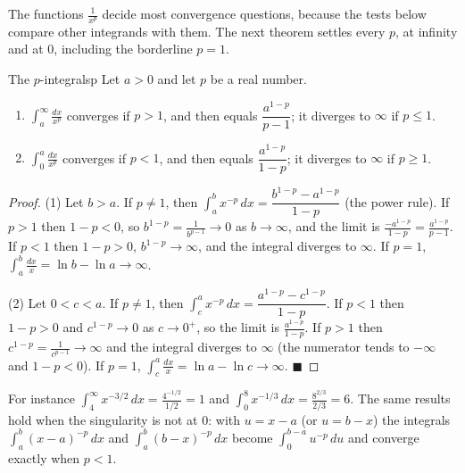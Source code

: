 \documentclass[11pt]{article}
\begin{document}
The functions $\frac1{x^p}$ decide most convergence questions, because the tests below compare other integrands with them. The next theorem settles every $p$, at infinity and at $0$, including the borderline $p=1$.

\begin{thm}{The $p$-integrals}{p}
Let $a>0$ and let $p$ be a real number.
\begin{enumerate}[label=(\arabic*),leftmargin=*]
  \item $\displaystyle\int_a^\infty\frac{dx}{x^p}$ converges if $p>1$, and then equals $\dfrac{a^{1-p}}{p-1}$; it diverges to $\infty$ if $p\le1$.
  \item $\displaystyle\int_0^a\frac{dx}{x^p}$ converges if $p<1$, and then equals $\dfrac{a^{1-p}}{1-p}$; it diverges to $\infty$ if $p\ge1$.
\end{enumerate}
\end{thm}
\begin{proof}
(1) Let $b>a$. If $p\ne1$, then $\int_a^bx^{-p}\,dx=\dfrac{b^{1-p}-a^{1-p}}{1-p}$ (the power rule). If $p>1$ then $1-p<0$, so $b^{1-p}=\frac1{b^{p-1}}\to0$ as $b\to\infty$, and the limit is $\frac{-a^{1-p}}{1-p}=\frac{a^{1-p}}{p-1}$. If $p<1$ then $1-p>0$, $b^{1-p}\to\infty$, and the integral diverges to $\infty$. If $p=1$, $\int_a^b\frac{dx}x=\ln b-\ln a\to\infty$.

(2) Let $0<c<a$. If $p\ne1$, then $\int_c^ax^{-p}\,dx=\dfrac{a^{1-p}-c^{1-p}}{1-p}$. If $p<1$ then $1-p>0$ and $c^{1-p}\to0$ as $c\to0^+$, so the limit is $\frac{a^{1-p}}{1-p}$. If $p>1$ then $c^{1-p}=\frac1{c^{p-1}}\to\infty$ and the integral diverges to $\infty$ (the numerator tends to $-\infty$ and $1-p<0$). If $p=1$, $\int_c^a\frac{dx}x=\ln a-\ln c\to\infty$. $\blacksquare$
\end{proof}

For instance $\int_4^\infty x^{-3/2}\,dx=\frac{4^{-1/2}}{1/2}=1$ and $\int_0^8x^{-1/3}\,dx=\frac{8^{2/3}}{2/3}=6$. The same results hold when the singularity is not at $0$: with $u=x-a$ (or $u=b-x$) the integrals $\int_a^b(x-a)^{-p}\,dx$ and $\int_a^b(b-x)^{-p}\,dx$ become $\int_0^{b-a}u^{-p}\,du$ and converge exactly when $p<1$.
\end{document}
